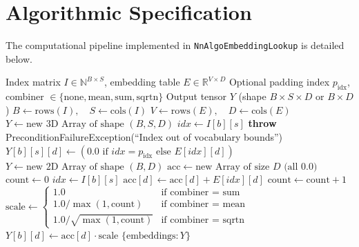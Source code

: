 \documentclass[11pt,a4paper]{article}
\theoremstyle{definition}
\begin{document}
\section{Algorithmic Specification}

The computational pipeline implemented in \texttt{NnAlgoEmbeddingLookup} is detailed below.

\begin{algorithm}[H]
\caption{Embedding Lookup and Sequence Aggregation}
\begin{algorithmic}[1]
\Require Index matrix $I \in \mathbb{N}^{B \times S}$, embedding table $E \in \mathbb{R}^{V \times D}$
\Require Optional padding index $p_{\text{idx}}$, combiner $\in \{\text{none}, \text{mean}, \text{sum}, \text{sqrtn}\}$
\Ensure Output tensor $Y$ (shape $B \times S \times D$ or $B \times D$)
\State $B \gets \text{rows}(I), \quad S \gets \text{cols}(I)$
\State $V \gets \text{rows}(E), \quad D \gets \text{cols}(E)$
    \State $Y \gets \text{new 3D Array of shape } (B, S, D)$
            \State $idx \gets I[b][s]$
                \State \textbf{throw} PreconditionFailureException(``Index out of vocabulary bounds'')
            \EndIf
                \State $Y[b][s][d] \gets (0.0 \text{ if } idx = p_{\text{idx}} \text{ else } E[idx][d])$
            \EndFor
        \EndFor
    \EndFor
\Else
    \State $Y \gets \text{new 2D Array of shape } (B, D)$
        \State $\text{acc} \gets \text{new Array of size } D \text{ (all 0.0)}$
        \State $\text{count} \gets 0$
            \State $idx \gets I[b][s]$
                    \State $\text{acc}[d] \gets \text{acc}[d] + E[idx][d]$
                \EndFor
                \State $\text{count} \gets \text{count} + 1$
            \EndIf
        \EndFor
        \State $\text{scale} \gets \begin{cases} 1.0 & \text{if combiner = sum} \\ 1.0/\max(1, \text{count}) & \text{if combiner = mean} \\ 1.0/\sqrt{\max(1, \text{count})} & \text{if combiner = sqrtn} \end{cases}$
            \State $Y[b][d] \gets \text{acc}[d] \cdot \text{scale}$
        \EndFor
    \EndFor
\EndIf
\State \Return $\{\text{embeddings}: Y\}$
\end{algorithmic}
\end{algorithm}
\end{document}
